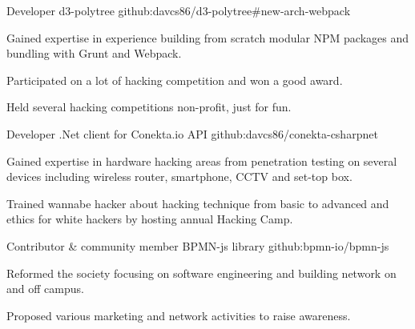 


\begin{cventries}


\cventry
{Developer} %
{d3-polytree} %
{github:davcs86/d3-polytree#new-arch-webpack} %
{ } %
{ %
	\begin{cvitems}
		\item {Gained expertise in experience building from scratch modular NPM packages and bundling with Grunt and Webpack.}
		\item {Participated on a lot of hacking competition and won a good award.}
		\item {Held several hacking competitions non-profit, just for fun.}
	\end{cvitems}
}


\cventry
{Developer} %
{.Net client for Conekta.io API} %
{github:davcs86/conekta-csharpnet} %
{ } %
{ %
	\begin{cvitems}
		\item {Gained expertise in hardware hacking areas from penetration testing on several devices including wireless router, smartphone, CCTV and set-top box.}
		\item {Trained wannabe hacker about hacking technique from basic to advanced and ethics for white hackers by hosting annual Hacking Camp.}
	\end{cvitems}
}


\cventry
{Contributor \& community member} %
{BPMN-js library} %
{github:bpmn-io/bpmn-js} %
{ } %
{ %
	\begin{cvitems}
		\item {Reformed the society focusing on software engineering and building network on and off campus.}
		\item {Proposed various marketing and network activities to raise awareness.}
	\end{cvitems}
}


\end{cventries}
